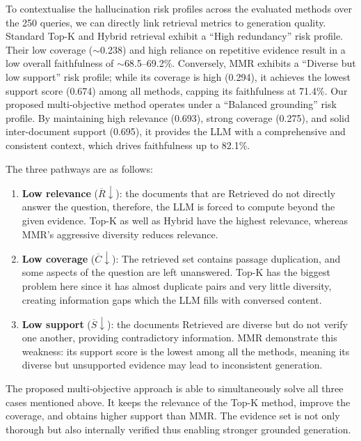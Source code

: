 \documentclass[conference]{IEEEtran}
\begin{document}
To contextualise the hallucination risk profiles across the evaluated methods over the 250 queries, we can directly link retrieval metrics to generation quality. Standard Top-K and Hybrid retrieval exhibit a ``High redundancy'' risk profile. Their low coverage ($\sim$0.238) and high reliance on repetitive evidence result in a low overall faithfulness of $\sim$68.5--69.2\%. Conversely, MMR exhibits a ``Diverse but low support'' risk profile; while its coverage is high (0.294), it achieves the lowest support score (0.674) among all methods, capping its faithfulness at 71.4\%. Our proposed multi-objective method operates under a ``Balanced grounding'' risk profile. By maintaining high relevance (0.693), strong coverage (0.275), and solid inter-document support (0.695), it provides the LLM with a comprehensive and consistent context, which drives faithfulness up to 82.1\%.

The three pathways are as follows:

\begin{enumerate}
\item \textbf{Low relevance} ($\overline{R} \downarrow$): the documents that are Retrieved do not directly answer the question, therefore, the LLM is forced to compute beyond the given evidence. Top-K as well as Hybrid have the highest relevance, whereas MMR's aggressive diversity reduces relevance.

\item \textbf{Low coverage} ($\overline{C} \downarrow$): The retrieved set contains passage duplication, and some aspects of the question are left unanswered. Top-K has the biggest problem here since it has almost duplicate pairs and very little diversity, creating information gaps which the LLM fills with conversed content.

\item \textbf{Low support} ($\overline{S} \downarrow$): the documents Retrieved are diverse but do not verify one another, providing contradictory information. MMR demonstrate this weakness: its support score is the lowest among all the methods, meaning its diverse but unsupported evidence may lead to inconsistent generation.
\end{enumerate}

The proposed multi-objective approach is able to simultaneously solve all three cases mentioned above. It keeps the relevance of the Top-K method, improve the coverage, and obtains higher support than MMR. The evidence set is not only thorough but also internally verified thus enabling stronger grounded generation.
\end{document}
